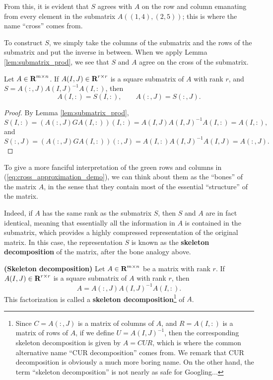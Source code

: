 \documentclass{article}
\begin{document}
	From this, it is evident that $S$ agrees with $A$ on the row and column emanating from every element in the submatrix $A((1,4),(2,5))$; this is where the name ``cross'' comes from.
	
	To construct $S$, we simply take the columns of the submatrix and the rows of the submatrix and put the inverse in between. When we apply Lemma \ref{lem:submatrix_prod}, we see that $S$ and $A$ agree on the cross of the submatrix.
	
	\begin{thm}
		\label{thm:skeleton_submatrix_exact}
		Let $A \in \textnormal{\bf R}^{m\times n}$. If $A(I,J) \in \textnormal{\bf R}^{r\times r}$ is a square submatrix of $A$ with rank $r$, and $S = A(:,J)A(I,J)^{-1}A(I,:)$, then
		\begin{equation}
			\label{eq:skeleton_submatrix_exact}
			A(I,:) = S(I,:), \qquad A(:,J) = S(:,J).
		\end{equation}
	\end{thm}
	
	\begin{proof}
		By Lemma \ref{lem:submatrix_prod},
		\begin{equation}
			S(I,:) = (A(:, J)GA(I,:))(I,:) = A(I,J)A(I,J)^{-1}A(I,:) = A(I,:),
		\end{equation}
		and
		\begin{equation}
			S(:,J) = (A(:, J)GA(I,:))(:,J) = A(I,:)A(I,J)^{-1}A(I,J) = A(:, J).
		\end{equation}
	\end{proof}
	
	To give a more fanciful interpretation of the green rows and columns in (\ref{eq:cross_approximation_demo}), we can think about them as the ``bones'' of the matrix $A$, in the sense that they contain most of the essential ``structure'' of the matrix. 
	
	Indeed, if $A$ has the same rank as the submatrix $S$, then $S$ and $A$ are in fact identical, meaning that essentially all the information in $A$ is contained in the submatrix, which provides a highly compressed representation of the original matrix. In this case, the representation $S$ is known as the \textbf{skeleton decomposition} of the matrix, after the bone analogy above.
	
	\begin{thm}
		\label{thm:skeleton_decomposition} \textnormal{\bf(Skeleton decomposition)}
		Let $A \in \textnormal{\bf R}^{m\times n}$ be a matrix with rank $r$. If $A(I,J) \in \textnormal{\bf R}^{r\times r}$ is a square submatrix of $A$ with rank $r$, then
		\begin{equation}
			\label{eq:skeleton}
			A = A(:,J)A(I,J)^{-1}A(I,:).
		\end{equation}
		This factorization is called a \textbf{skeleton decomposition}\footnote{Since $C = A(:,J)$ is a matrix of columns of $A$, and $R = A(I,:)$ is a matrix of rows of $A$, if we define $U = A(I,J)^{-1}$, then the corresponding skeleton decomposition is given by $A = CUR$, which is where the common alternative name ``CUR decomposition'' comes from. We remark that CUR decomposition is obviously a much more boring name. On the other hand, the term ``skeleton decomposition'' is not nearly as safe for Googling...} of $A$.
	\end{thm}
	
\end{document}
